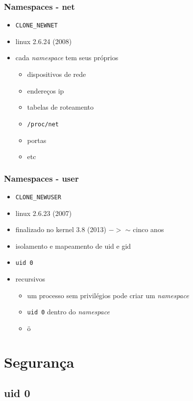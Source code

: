 \documentclass{beamer}
\begin{document}
\begin{frame}
    \frametitle{Namespaces - net}
    \begin{itemize}
        \item \texttt{CLONE\_NEWNET}
        \item linux 2.6.24 (2008)
        \item cada \textit{namespace} tem seus próprios
            \begin{itemize}
                \item dispositivos de rede
                \item endereços ip
                \item tabelas de roteamento
                \item \texttt{/proc/net}
                \item portas
                \item etc
            \end{itemize}
    \end{itemize}
\end{frame}

\begin{frame}
    \frametitle{Namespaces - user}
    \begin{itemize}
        \item \texttt{CLONE\_NEWUSER}
        \item linux 2.6.23 (2007)
        \item finalizado no kernel 3.8 (2013) $->$ $\sim$ cinco anos
        \item isolamento e mapeamento de uid e gid
        \item \texttt{uid 0}
        \item recursivos
        \begin{itemize}
            \item um processo sem privilégios pode criar um \textit{namespace}
            \item \texttt{uid 0} dentro do \textit{namespace}
            \item ö
        \end{itemize}
    \end{itemize}
\end{frame}

\section{Segurança}

\subsection{uid 0}
\end{document}

